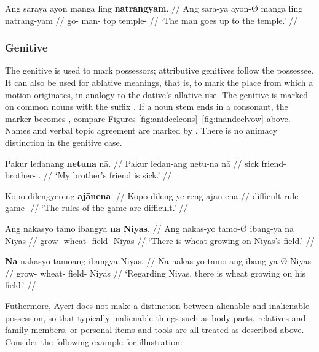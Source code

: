 \a\label{ex:datlocprep}\begingl
	\gla Ang saraya ayon manga ling \textbf{natrangyam}. //
	\glb Ang sara-ya ayon-Ø manga ling natrang-yam //
	\glc \AgtT{} go-\TsgM{} man-\Top{} \Dyn{} top temple-\Dat{} //
	\glft `The man goes up to the temple.' //
\endgl

\xe


\subsubsection{Genitive}
\label{subsubsec:genitive}

The genitive is used to mark possessors; attributive genitives follow the 
possessee. It can also be used for ablative meanings, that is, to mark the 
place from which a motion originates, in analogy to the dative's allative use. 
The genitive is marked on common nouns with the suffix . If a 
noun stem ends in a consonant, the marker becomes , compare 
Figures \ref{fig:anideclcons}–\ref{fig:inandeclvow} above. Names and verbal 
topic agreement are marked by . There is no animacy distinction in 
the genitive case.

\pex
\a\begingl
	\gla Pakur ledanang \textbf{netuna} nā. //
	\glb Pakur ledan-ang netu-na nā //
	\glc sick friend-\Aarg{} brother-\Gen{} \Fsg{}.\Gen{} //
	\glft `My brother's friend is sick.' //
\endgl

\a\begingl
	\gla Kopo dilengyereng \textbf{ajānena}. //
	\glb Kopo dileng-ye-reng ajān-ena //
	\glc difficult rule-\Pl{}-\AargI{} game-\Gen{} //
	\glft `The rules of the game are difficult.' //
\endgl

\a\begingl
	\gla Ang nakasyo tamo ibangya \textbf{na} \textbf{Niyas}. //
	\glb Ang nakas-yo tamo-Ø ibang-ya na Niyas //
	\glc \AgtT{} grow-\TsgN{} wheat-\Top{} field-\Loc{} \Gen{} Niyas //
	\glft `There is wheat growing on Niyas's field.' //
\endgl

\a\begingl
	\gla \textbf{Na} nakasyo tamoang ibangya {} Niyas. //
	\glb Na nakas-yo tamo-ang ibang-ya Ø Niyas //
	\glc \GenT{} grow-\TsgN{} wheat-\Aarg{} field-\Loc{} \Top{} Niyas //
	\glft `Regarding Niyas, there is wheat growing on his field.' //
\endgl

\xe

Futhermore, Ayeri does not make a distinction between alienable and inalienable
possession, so that typically inalienable things such as body parts, relatives
and family members, or personal items and tools are all treated as described
above. Consider the following example for illustration:


